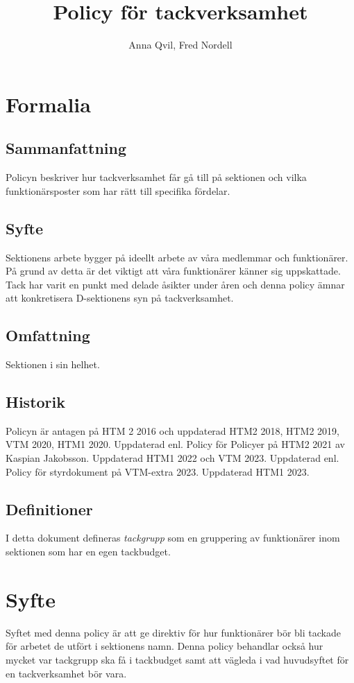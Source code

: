 \documentclass{dsekprotokoll}
\title{Policy för tackverksamhet}
\author{Anna Qvil, Fred Nordell}
\begin{document}
\maketitle
\section{Formalia}
\subsection{Sammanfattning}
Policyn beskriver hur tackverksamhet får gå till på sektionen och vilka funktionärsposter som har rätt till specifika fördelar.

\subsection{Syfte}
Sektionens arbete bygger på ideellt arbete av våra medlemmar och funktionärer. På grund av detta är det viktigt att våra funktionärer känner sig uppskattade. Tack har varit en punkt med delade åsikter under åren och denna policy ämnar att konkretisera D-sektionens syn på tackverksamhet.

\subsection{Omfattning}
Sektionen i sin helhet.

\subsection{Historik}
Policyn är antagen på HTM 2 2016 och uppdaterad HTM2 2018, HTM2 2019, VTM 2020, HTM1 2020.
Uppdaterad enl. Policy för Policyer på HTM2 2021 av Kaspian Jakobsson.
Uppdaterad HTM1 2022 och VTM 2023.
Uppdaterad enl. Policy för styrdokument på VTM-extra 2023.
Uppdaterad HTM1 2023.

\subsection{Definitioner}
I detta dokument defineras \textit{tackgrupp} som en gruppering
av funktionärer inom sektionen som har en egen tackbudget.



\section{Syfte}
Syftet med denna policy är att ge direktiv för hur funktionärer bör  bli tackade för arbetet de utfört i sektionens namn. Denna policy behandlar också hur mycket var tackgrupp ska få i tackbudget samt att vägleda i vad huvudsyftet för en tackverksamhet bör vara.
\end{document}
